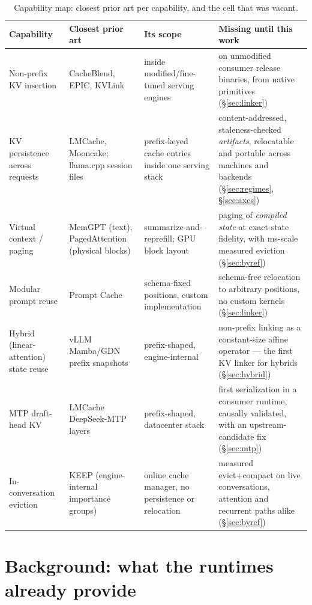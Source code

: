 \documentclass[11pt]{article}
\begin{document}
\begin{landscape}
\begin{table}[p]
  \centering\small
  \setlength{\tabcolsep}{6pt}
  \caption{Capability map: closest prior art per capability, and the cell that was vacant.}
  \label{tab:gap}
  \begin{tabular}{p{3.4cm}p{4.4cm}p{5.2cm}p{8.2cm}}
    \toprule
    Capability & Closest prior art & Its scope & Missing until this work \\
    \midrule
    Non-prefix KV insertion & CacheBlend, EPIC, KVLink & inside modified/fine-tuned serving engines & on unmodified consumer release binaries, from native primitives (\S\ref{sec:linker}) \\
    KV persistence across requests & LMCache, Mooncake; llama.cpp session files & prefix-keyed cache entries inside one serving stack & content-addressed, staleness-checked \emph{artifacts}, relocatable and portable across machines and backends (\S\ref{sec:regimes}, \S\ref{sec:axes}) \\
    Virtual context / paging & MemGPT (text), PagedAttention (physical blocks) & summarize-and-reprefill; GPU block layout & paging of \emph{compiled state} at exact-state fidelity, with ms-scale measured eviction (\S\ref{sec:byref}) \\
    Modular prompt reuse & Prompt Cache & schema-fixed positions, custom implementation & schema-free relocation to arbitrary positions, no custom kernels (\S\ref{sec:linker}) \\
    Hybrid (linear-attention) state reuse & vLLM Mamba/GDN prefix snapshots & prefix-shaped, engine-internal & non-prefix linking as a constant-size affine operator --- the first KV linker for hybrids (\S\ref{sec:hybrid}) \\
    MTP draft-head KV & LMCache DeepSeek-MTP layers & prefix-shaped, datacenter stack & first serialization in a consumer runtime, causally validated, with an upstream-candidate fix (\S\ref{sec:mtp}) \\
    In-conversation eviction & KEEP (engine-internal importance groups) & online cache manager, no persistence or relocation & measured evict+compact on live conversations, attention and recurrent paths alike (\S\ref{sec:byref}) \\
    \bottomrule
  \end{tabular}
\end{table}
\end{landscape}

\section{Background: what the runtimes already provide}
\label{sec:background}
\end{document}

